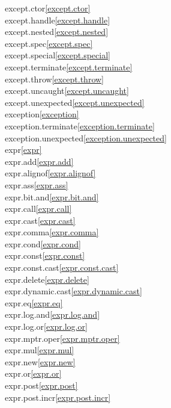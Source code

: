 \begin{multicols}{2}
except.ctor\quad\ref{except.ctor}\\
except.handle\quad\ref{except.handle}\\
except.nested\quad\ref{except.nested}\\
except.spec\quad\ref{except.spec}\\
except.special\quad\ref{except.special}\\
except.terminate\quad\ref{except.terminate}\\
except.throw\quad\ref{except.throw}\\
except.uncaught\quad\ref{except.uncaught}\\
except.unexpected\quad\ref{except.unexpected}\\
exception\quad\ref{exception}\\
exception.terminate\quad\ref{exception.terminate}\\
exception.unexpected\quad\ref{exception.unexpected}\\
expr\quad\ref{expr}\\
expr.add\quad\ref{expr.add}\\
expr.alignof\quad\ref{expr.alignof}\\
expr.ass\quad\ref{expr.ass}\\
expr.bit.and\quad\ref{expr.bit.and}\\
expr.call\quad\ref{expr.call}\\
expr.cast\quad\ref{expr.cast}\\
expr.comma\quad\ref{expr.comma}\\
expr.cond\quad\ref{expr.cond}\\
expr.const\quad\ref{expr.const}\\
expr.const.cast\quad\ref{expr.const.cast}\\
expr.delete\quad\ref{expr.delete}\\
expr.dynamic.cast\quad\ref{expr.dynamic.cast}\\
expr.eq\quad\ref{expr.eq}\\
expr.log.and\quad\ref{expr.log.and}\\
expr.log.or\quad\ref{expr.log.or}\\
expr.mptr.oper\quad\ref{expr.mptr.oper}\\
expr.mul\quad\ref{expr.mul}\\
expr.new\quad\ref{expr.new}\\
expr.or\quad\ref{expr.or}\\
expr.post\quad\ref{expr.post}\\
expr.post.incr\quad\ref{expr.post.incr}\\

\end{multicols}
